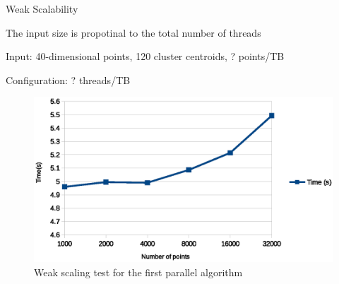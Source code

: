 \documentclass[
nopagebreaks,
style=klope,
fleqn]{powerdot}
\begin{document}
\begin{slide}{Weak Scalability}

  \begin{compactitem}
  \item{The input size is propotinal to the total number of threads}
  \item{Input: 40-dimensional points, 120 cluster centroids, ? points/TB}
  \item{Configuration: ? threads/TB}
  \end{compactitem}

\begin{figure}[!h]
  \centering
  \includegraphics[width=0.7\linewidth]{fig/weak_scaling}
  \caption{Weak scaling test for the first parallel algorithm}
  \label{fig:weak_scaling}
\end{figure}
\end{slide}
\end{document}
